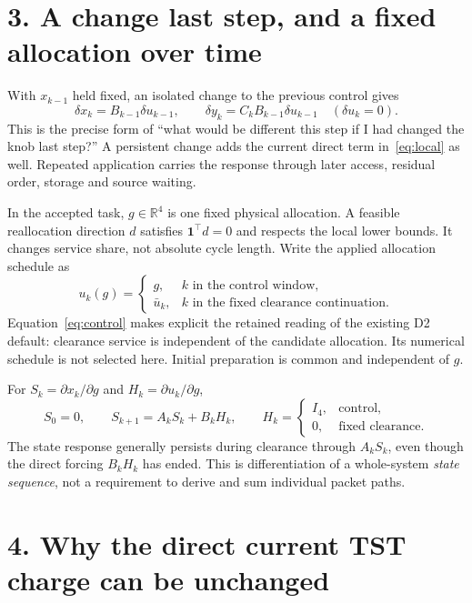 \documentclass[11pt]{article}
\newcommand{\R}{\mathbb R}
\begin{document}
\section*{3. A change last step, and a fixed allocation over time}

With $x_{k-1}$ held fixed, an isolated change to the previous control gives
\begin{equation}
 \delta x_k=B_{k-1}\delta u_{k-1},\qquad
 \delta y_k=C_kB_{k-1}\delta u_{k-1}
 \quad(\delta u_k=0).
 \label{eq:laststep}
\end{equation}
This is the precise form of ``what would be different this step if I had changed the knob last step?'' A persistent change adds the current direct term in~\eqref{eq:local} as well. Repeated application carries the response through later access, residual order, storage and source waiting.

In the accepted task, $g\in\R^4$ is one fixed physical allocation. A feasible reallocation direction $d$ satisfies $\mathbf1^\top d=0$ and respects the local lower bounds. It changes service share, not absolute cycle length. Write the applied allocation schedule as
\begin{equation}
 u_k(g)=\begin{cases}g,&k\text{ in the control window},\\
 \bar u_k,&k\text{ in the fixed clearance continuation}.
 \end{cases}
 \label{eq:control}
\end{equation}
Equation~\eqref{eq:control} makes explicit the retained reading of the existing D2 default: clearance service is independent of the candidate allocation. Its numerical schedule is not selected here. Initial preparation is common and independent of $g$.

For $S_k=\partial x_k/\partial g$ and $H_k=\partial u_k/\partial g$,
\begin{equation}
 S_0=0,\qquad S_{k+1}=A_kS_k+B_kH_k,
 \qquad H_k=\begin{cases}I_4,&\text{control},\\0,&\text{fixed clearance}.
 \end{cases}
 \label{eq:sequence}
\end{equation}
The state response generally persists during clearance through $A_kS_k$, even though the direct forcing $B_kH_k$ has ended. This is differentiation of a whole-system \emph{state sequence}, not a requirement to derive and sum individual packet paths.

\section*{4. Why the direct current TST charge can be unchanged}
\end{document}
